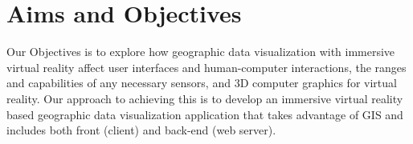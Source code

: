 \section{Aims and Objectives}

Our Objectives is to explore how geographic data visualization with immersive virtual reality affect user interfaces and human-computer interactions, the ranges and capabilities of any necessary sensors, and 3D computer graphics for virtual reality. Our approach to achieving this is to develop an immersive virtual reality based geographic data visualization application that takes advantage of GIS and includes both front (client) and back-end (web server).

